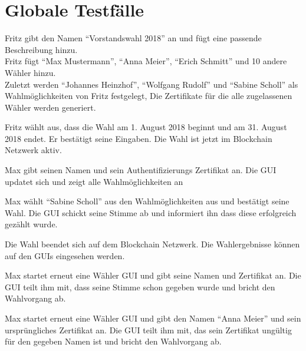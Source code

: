 \documentclass[parskip=full,11pt,twoside]{scrartcl}
\begin{document}
\section{Globale Testfälle}

		{Fritz gibt den Namen \enquote{Vorstandswahl 2018} an und fügt eine passende Beschreibung hinzu.\\
		Fritz fügt \enquote{Max Mustermann}, \enquote{Anna Meier}, \enquote{Erich Schmitt} und 10 andere Wähler hinzu.\\
		Zuletzt werden \enquote{Johannes Heinzhof}, \enquote{Wolfgang Rudolf} und \enquote{Sabine Scholl} als Wahlmöglichkeiten von Fritz festgelegt,}
		{Die Zertifikate für die alle zugelassenen Wähler werden generiert.}	
	
\teststep{}
		{Fritz wählt aus, dass die Wahl am 1. August 2018 beginnt und am 31. August 2018 endet. Er bestätigt seine Eingaben.}
		{Die Wahl ist jetzt im Blockchain Netzwerk aktiv.}

		{Max gibt seinen Namen und sein Authentifizierungs Zertifikat an.}
		{Die GUI updatet sich und zeigt alle Wahlmöglichkeiten an}
		
\teststep{}
		{Max wählt \enquote{Sabine Scholl} aus den Wahlmöglichkeiten aus und bestätigt seine Wahl.}
		{Die GUI schickt seine Stimme ab und informiert ihn dass diese erfolgreich gezählt wurde.}
		
		{Die Wahl beendet sich auf dem Blockchain Netzwerk.}
		{Die Wahlergebnisse können auf den GUIs eingesehen werden.}
		
		{Max startet erneut eine Wähler GUI und gibt seine Namen und Zertifikat an.}
		{Die GUI teilt ihm mit, dass seine Stimme schon gegeben wurde und bricht den Wahlvorgang ab.}

\teststep{}
		{Max startet erneut eine Wähler GUI und gibt den Namen \enquote{Anna Meier} und sein ursprüngliches Zertifikat an.}
		{Die GUI teilt ihm mit, das sein Zertifikat ungültig für den gegeben Namen ist und bricht den Wahlvorgang ab.}
\end{document}
